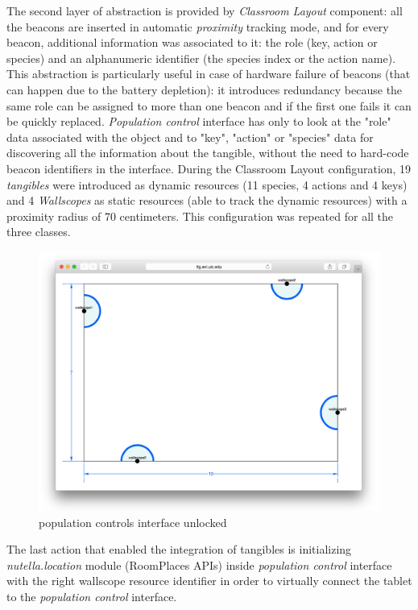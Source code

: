 The second layer of abstraction is provided by \textit{Classroom Layout} component: all the beacons are inserted in automatic \textit{proximity} tracking mode, and for every beacon, additional information was associated to it: the role (key, action or species) and an alphanumeric identifier (the species index or the action name). This abstraction is particularly useful in case of hardware failure of beacons (that can happen due to the battery depletion): it introduces redundancy because the same role can be assigned to more than one beacon and if the first one fails it can be quickly replaced. \textit{Population control} interface has only to look at the "role" data associated with the object and to "key", "action" or "species" data for discovering all the information about the tangible, without the need to hard-code beacon identifiers in the interface. During the Classroom Layout configuration, 19 \textit{tangibles} were introduced as dynamic resources (11 species, 4 actions and 4 keys) and 4 \textit{Wallscopes} as static resources (able to track the dynamic resources) with a proximity radius of 70 centimeters. This configuration was repeated for all the three classes.

\begin{figure}
\centering
\includegraphics[width=4.5in]{images/wallcology-classroom-layout.png}
\caption{population controls interface unlocked}
\label{fig:wallcology_classroom_layout}
\end{figure}

The last action that enabled the integration of tangibles is initializing \textit{nutella.location} module (RoomPlaces APIs) inside \textit{population control} interface with the right wallscope resource identifier in order to virtually connect the tablet to the \textit{population control} interface.

